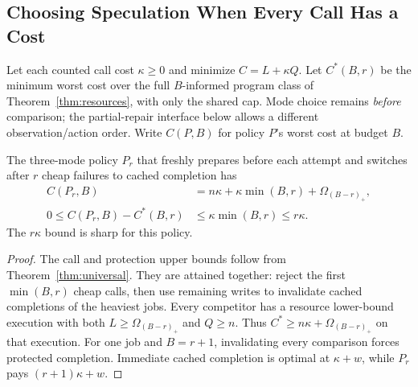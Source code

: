 \subsection{Choosing Speculation When Every Call Has a Cost}

Let each counted call cost $\kappa\ge0$ and minimize $C=L+\kappa Q$. Let $C^*(B,r)$ be the minimum worst cost over the full $B$-informed program class of Theorem~\ref{thm:resources}, with only the shared cap. Mode choice remains \emph{before} comparison; the partial-repair interface below allows a different observation/action order. Write $C(P,B)$ for policy $P$'s worst cost at budget $B$.

\begin{proposition}
\label{prop:fulltoll}
The three-mode policy $P_r$ that freshly prepares before each attempt and switches after $r$ cheap failures to cached completion has
\[
\begin{aligned}
 C(P_r,B)&=n\kappa+\kappa\min(B,r)+\Omega_{(B-r)_+},\\
 0\le C(P_r,B)-C^*(B,r)&\le\kappa\min(B,r)\le r\kappa.
\end{aligned}
\]
The $r\kappa$ bound is sharp for this policy.
\end{proposition}
\begin{proof}
The call and protection upper bounds follow from Theorem~\ref{thm:universal}. They are attained together: reject the first $\min(B,r)$ cheap calls, then use remaining writes to invalidate cached completions of the heaviest jobs. Every competitor has a resource lower-bound execution with both $L\ge\Omega_{(B-r)_+}$ and $Q\ge n$. Thus $C^*\ge n\kappa+\Omega_{(B-r)_+}$ on that execution. For one job and $B=r+1$, invalidating every comparison forces protected completion. Immediate cached completion is optimal at $\kappa+w$, while $P_r$ pays $(r+1)\kappa+w$.
\end{proof}

